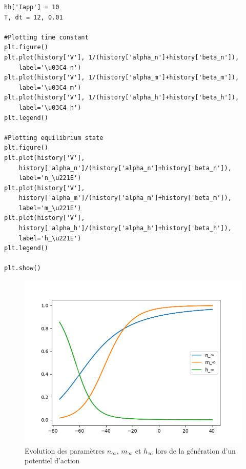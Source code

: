 \documentclass[12pt]{scrartcl}
\begin{document}
\clearpage

\begin{lstlisting}[caption = {Simulation du modèle 4}]
hh['Iapp'] = 10
T, dt = 12, 0.01

#Plotting time constant
plt.figure()
plt.plot(history['V'], 1/(history['alpha_n']+history['beta_n']),
	label='\u03C4_n')
plt.plot(history['V'], 1/(history['alpha_m']+history['beta_m']),
	label='\u03C4_m')
plt.plot(history['V'], 1/(history['alpha_h']+history['beta_h']),
	label='\u03C4_h')
plt.legend()

#Plotting equilibrium state
plt.figure()
plt.plot(history['V'],
	history['alpha_n']/(history['alpha_n']+history['beta_n']),
	label='n_\u221E')
plt.plot(history['V'],
	history['alpha_m']/(history['alpha_m']+history['beta_m']),
	label='m_\u221E')
plt.plot(history['V'],
	history['alpha_h']/(history['alpha_h']+history['beta_h']),
	label='h_\u221E')
plt.legend()

plt.show()
\end{lstlisting}

\begin{figure}[!h]
\centering
\includegraphics[scale=0.5]{imgs/hhinfty.png}
\caption{Evolution des paramètres $n_\infty$, $m_\infty$ et $h_\infty$ lors de la génération d'un potentiel d'action}
\label{hhinfty}
\end{figure}
\end{document}

